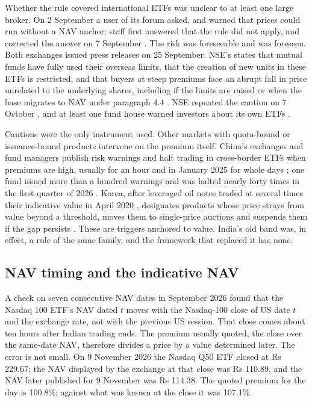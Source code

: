 \documentclass[11pt,a4paper]{article}
\theoremstyle{definition}
\begin{document}
Whether the rule covered international ETFs was unclear to at least one large broker. On 2 September a user of its forum asked, and warned that prices could run without a NAV anchor; staff first answered that the rule did not apply, and corrected the answer on 7 September \citep{zerodha2026forum}. The risk was foreseeable and was foreseen. Both exchanges issued press releases on 25 September. NSE's states that mutual funds have fully used their overseas limits, that the creation of new units in these ETFs is restricted, and that buyers at steep premiums face an abrupt fall in price unrelated to the underlying shares, including if the limits are raised or when the base migrates to NAV under paragraph 4.4 \citep{nse2026press,bse2026press}. NSE repeated the caution on 7 October \citep{reuters2026nse}, and at least one fund house warned investors about its own ETFs \citep{cafemutual2026mirae}.

Cautions were the only instrument used. Other markets with quota-bound or issuance-bound products intervene on the premium itself. China's exchanges and fund managers publish risk warnings and halt trading in cross-border ETFs when premiums are high, usually for an hour and in January 2025 for whole days \citep{bloomberg2025halts}; one fund issued more than a hundred warnings and was halted nearly forty times in the first quarter of 2026 \citep{yicai2026quota}. Korea, after leveraged oil notes traded at several times their indicative value in April 2020 \citep{asiae2020etn}, designates products whose price strays from value beyond a threshold, moves them to single-price auctions and suspends them if the gap persists \citep{fsc2020measures}. These are triggers anchored to value. India's old band was, in effect, a rule of the same family, and the framework that replaced it has none.

\subsection{NAV timing and the indicative NAV}
A check on seven consecutive NAV dates in September 2026 found that the Nasdaq 100 ETF's NAV dated $t$ moves with the Nasdaq-100 close of US date $t$ and the exchange rate, not with the previous US session. That close comes about ten hours after Indian trading ends. The premium usually quoted, the close over the same-date NAV, therefore divides a price by a value determined later. The error is not small. On 9 November 2026 the Nasdaq Q50 ETF closed at Rs 229.67; the NAV displayed by the exchange at that close was Rs 110.89, and the NAV later published for 9 November was Rs 114.38. The quoted premium for the day is 100.8\%; against what was known at the close it was 107.1\%.
\end{document}
